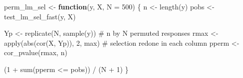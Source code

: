 \documentclass[
  letterpaper,
  DIV=11,
  numbers=noendperiod]{scrreprt}
\newenvironment{Shaded}{\begin{snugshade}}{\end{snugshade}}
\newcommand{\AttributeTok}[1]{\textcolor[rgb]{0.40,0.45,0.13}{#1}}
\newcommand{\CommentTok}[1]{\textcolor[rgb]{0.37,0.37,0.37}{#1}}
\newcommand{\ControlFlowTok}[1]{\textcolor[rgb]{0.00,0.23,0.31}{\textbf{#1}}}
\newcommand{\DecValTok}[1]{\textcolor[rgb]{0.68,0.00,0.00}{#1}}
\newcommand{\FunctionTok}[1]{\textcolor[rgb]{0.28,0.35,0.67}{#1}}
\newcommand{\NormalTok}[1]{\textcolor[rgb]{0.00,0.23,0.31}{#1}}
\newcommand{\OtherTok}[1]{\textcolor[rgb]{0.00,0.23,0.31}{#1}}
\newcommand{\SpecialCharTok}[1]{\textcolor[rgb]{0.37,0.37,0.37}{#1}}
\begin{document}
\begin{Shaded}
\begin{Highlighting}[]
\NormalTok{perm\_lm\_sel }\OtherTok{\textless{}{-}} \ControlFlowTok{function}\NormalTok{(y, X, }\AttributeTok{N =} \DecValTok{500}\NormalTok{) \{}
\NormalTok{  n }\OtherTok{\textless{}{-}} \FunctionTok{length}\NormalTok{(y)}
\NormalTok{  pobs }\OtherTok{\textless{}{-}} \FunctionTok{test\_lm\_sel\_fast}\NormalTok{(y, X)}

\NormalTok{  Yp }\OtherTok{\textless{}{-}} \FunctionTok{replicate}\NormalTok{(N, }\FunctionTok{sample}\NormalTok{(y))            }\CommentTok{\# n by N permuted responses}
\NormalTok{  rmax }\OtherTok{\textless{}{-}} \FunctionTok{apply}\NormalTok{(}\FunctionTok{abs}\NormalTok{(}\FunctionTok{cor}\NormalTok{(X, Yp)), }\DecValTok{2}\NormalTok{, max)   }\CommentTok{\# selection redone in each column}
\NormalTok{  pperm }\OtherTok{\textless{}{-}} \FunctionTok{cor\_pvalue}\NormalTok{(rmax, n)}

\NormalTok{  (}\DecValTok{1} \SpecialCharTok{+} \FunctionTok{sum}\NormalTok{(pperm }\SpecialCharTok{\textless{}=}\NormalTok{ pobs)) }\SpecialCharTok{/}\NormalTok{ (N }\SpecialCharTok{+} \DecValTok{1}\NormalTok{)}
\NormalTok{\}}
\end{Highlighting}
\end{Shaded}
\end{document}

